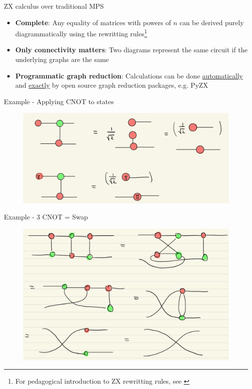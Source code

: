 \documentclass[aspectratio=169,xcolor=dvipsnames, t]{beamer}
\begin{document}
\begin{frame}{ZX calculus over traditional MPS}
    \begin{itemize}
        \item \textbf{Complete}: Any equality of matrices with powers of $n$ can be derived purely diagrammatically using the rewritting rules\footnote{For pedagogical introduction to ZX rewritting rules, see \cite{zx_for_working_qcs} }
    \item \textbf{Only connectivity matters}: Two diagrams represent the same circuit if the underlying graphs are the same
    \item \textbf{Programmatic graph reduction}: Calculations can be done \underline{automatically} and \underline{exactly} by open source graph reduction packages, e.g. PyZX
    \end{itemize}
\end{frame}

\begin{frame}{Example - Applying CNOT to states}
    \begin{figure}
        \includegraphics[width=.8\textwidth]{figures/zx_cnot_derivation.PNG}
    \end{figure}
\end{frame}

\begin{frame}{Example - 3 CNOT = Swap}
    \begin{figure}
        \includegraphics[width=.7\textwidth]{figures/zx_three_cnot_swap.PNG}
    \end{figure}
\end{frame}
\end{document}

